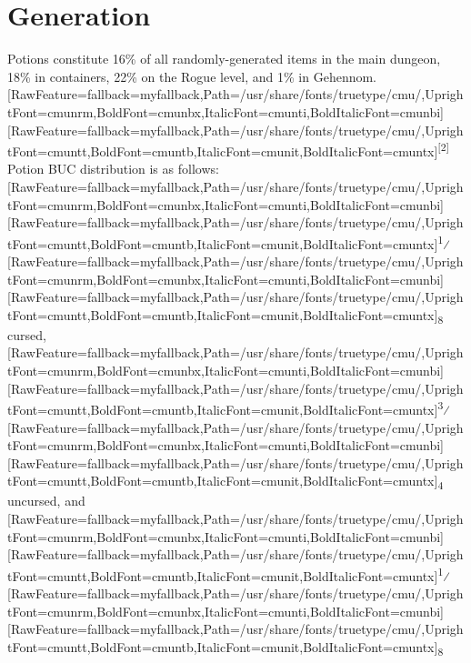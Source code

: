 \section{Generation}
\label{2}
Potions constitute 16\% of all randomly-{}generated items\footnotemark[77] in the main dungeon, 18\% in containers, 22\% on the Rogue level, and 1\% in Gehennom.\allowbreak{}\setmainfont{cmunrm.ttf}[RawFeature={fallback=myfallback},Path=/usr/share/fonts/truetype/cmu/,UprightFont=cmunrm,BoldFont=cmunbx,ItalicFont=cmunti,BoldItalicFont=cmunbi]\setmonofont{cmunrm.ttf}[RawFeature={fallback=myfallback},Path=/usr/share/fonts/truetype/cmu/,UprightFont=cmuntt,BoldFont=cmuntb,ItalicFont=cmunit,BoldItalicFont=cmuntx]\textsuperscript{{$\text{[}$}2{$\text{]}$}} Potion BUC distribution is as follows: \allowbreak{}\setmainfont{cmunrm.ttf}[RawFeature={fallback=myfallback},Path=/usr/share/fonts/truetype/cmu/,UprightFont=cmunrm,BoldFont=cmunbx,ItalicFont=cmunti,BoldItalicFont=cmunbi]\setmonofont{cmunrm.ttf}[RawFeature={fallback=myfallback},Path=/usr/share/fonts/truetype/cmu/,UprightFont=cmuntt,BoldFont=cmuntb,ItalicFont=cmunit,BoldItalicFont=cmuntx]\textsuperscript{1}⁄\allowbreak{}\setmainfont{cmunrm.ttf}[RawFeature={fallback=myfallback},Path=/usr/share/fonts/truetype/cmu/,UprightFont=cmunrm,BoldFont=cmunbx,ItalicFont=cmunti,BoldItalicFont=cmunbi]\setmonofont{cmunrm.ttf}[RawFeature={fallback=myfallback},Path=/usr/share/fonts/truetype/cmu/,UprightFont=cmuntt,BoldFont=cmuntb,ItalicFont=cmunit,BoldItalicFont=cmuntx]\textsubscript{8} cursed, \allowbreak{}\setmainfont{cmunrm.ttf}[RawFeature={fallback=myfallback},Path=/usr/share/fonts/truetype/cmu/,UprightFont=cmunrm,BoldFont=cmunbx,ItalicFont=cmunti,BoldItalicFont=cmunbi]\setmonofont{cmunrm.ttf}[RawFeature={fallback=myfallback},Path=/usr/share/fonts/truetype/cmu/,UprightFont=cmuntt,BoldFont=cmuntb,ItalicFont=cmunit,BoldItalicFont=cmuntx]\textsuperscript{3}⁄\allowbreak{}\setmainfont{cmunrm.ttf}[RawFeature={fallback=myfallback},Path=/usr/share/fonts/truetype/cmu/,UprightFont=cmunrm,BoldFont=cmunbx,ItalicFont=cmunti,BoldItalicFont=cmunbi]\setmonofont{cmunrm.ttf}[RawFeature={fallback=myfallback},Path=/usr/share/fonts/truetype/cmu/,UprightFont=cmuntt,BoldFont=cmuntb,ItalicFont=cmunit,BoldItalicFont=cmuntx]\textsubscript{4} uncursed, and \allowbreak{}\setmainfont{cmunrm.ttf}[RawFeature={fallback=myfallback},Path=/usr/share/fonts/truetype/cmu/,UprightFont=cmunrm,BoldFont=cmunbx,ItalicFont=cmunti,BoldItalicFont=cmunbi]\setmonofont{cmunrm.ttf}[RawFeature={fallback=myfallback},Path=/usr/share/fonts/truetype/cmu/,UprightFont=cmuntt,BoldFont=cmuntb,ItalicFont=cmunit,BoldItalicFont=cmuntx]\textsuperscript{1}⁄\allowbreak{}\setmainfont{cmunrm.ttf}[RawFeature={fallback=myfallback},Path=/usr/share/fonts/truetype/cmu/,UprightFont=cmunrm,BoldFont=cmunbx,ItalicFont=cmunti,BoldItalicFont=cmunbi]\setmonofont{cmunrm.ttf}[RawFeature={fallback=myfallback},Path=/usr/share/fonts/truetype/cmu/,UprightFont=cmuntt,BoldFont=cmuntb,ItalicFont=cmunit,BoldItalicFont=cmuntx]\textsubscript{8} 